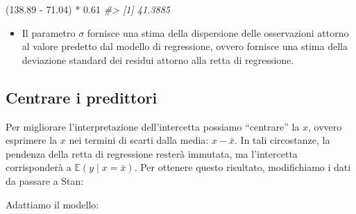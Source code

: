 \documentclass[
]{memoir}
\newenvironment{Shaded}{\begin{snugshade}}{\end{snugshade}}
\newcommand{\AttributeTok}[1]{\textcolor[rgb]{0.77,0.63,0.00}{#1}}
\newcommand{\CommentTok}[1]{\textcolor[rgb]{0.56,0.35,0.01}{\textit{#1}}}
\newcommand{\FloatTok}[1]{\textcolor[rgb]{0.00,0.00,0.81}{#1}}
\newcommand{\FunctionTok}[1]{\textcolor[rgb]{0.00,0.00,0.00}{#1}}
\newcommand{\NormalTok}[1]{#1}
\newcommand{\OtherTok}[1]{\textcolor[rgb]{0.56,0.35,0.01}{#1}}
\newcommand{\SpecialCharTok}[1]{\textcolor[rgb]{0.00,0.00,0.00}{#1}}
\providecommand{\tightlist}{%
  \setlength{\itemsep}{0pt}\setlength{\parskip}{0pt}}
\newcommand{\E}{\mathbb{E}} %
\begin{document}
\begin{Shaded}
\begin{Highlighting}[]
\NormalTok{(}\FloatTok{138.89} \SpecialCharTok{{-}} \FloatTok{71.04}\NormalTok{) }\SpecialCharTok{*} \FloatTok{0.61}
\CommentTok{\#\textgreater{} [1] 41.3885}
\end{Highlighting}
\end{Shaded}

\begin{itemize}
\tightlist
\item
  Il parametro \(\sigma\) fornisce una stima della dispersione delle osservazioni attorno al valore predetto dal modello di regressione, ovvero fornisce una stima della deviazione standard dei residui attorno alla retta di regressione.
\end{itemize}

\hypertarget{centrare-i-predittori}{%
\subsection{Centrare i predittori}\label{centrare-i-predittori}}

Per migliorare l'interpretazione dell'intercetta possiamo ``centrare'' la \(x\), ovvero esprimere la \(x\) nei termini di scarti dalla media: \(x - \bar{x}\). In tali circostanze, la pendenza della retta di regressione resterà immutata, ma l'intercetta corrisponderà a \(\E(y \mid x = \bar{x})\). Per ottenere questo risultato, modifichiamo i dati da passare a Stan:

\begin{Shaded}
\end{Shaded}

\noindent
Adattiamo il modello:
\end{document}
